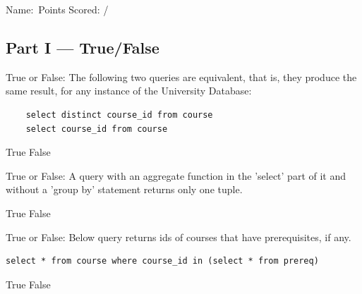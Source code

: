 \documentclass[12pt, addpoints, answers]{exam}
\begin{document}
\noindent Name:\ \makebox[3in]{\hrulefill}\hfill Points Scored: \underline{\hspace{3em}} / \numpoints
\begin{questions}

\section*{Part I — True/False}

\begin{minipage}{\linewidth}
\question[3]
True or False: The following two queries are equivalent, that is, they produce the same result, for any instance of the University Database:\par\vspace{0.5em}
\begin{verbatim}
    select distinct course_id from course
    select course_id from course
\end{verbatim}
\begin{checkboxes}
    \CorrectChoice True
    \choice False
\end{checkboxes}
\end{minipage}\vspace{1em}

\begin{minipage}{\linewidth}
\question[2]
True or False: A query with an aggregate function in the 'select' part of it and without a 'group by' statement returns only one tuple.\par\vspace{0.5em}
\begin{checkboxes}
    \CorrectChoice True
    \choice False
\end{checkboxes}
\end{minipage}\vspace{1em}

\begin{minipage}{\linewidth}
\question[2]
True or False: Below query returns ids of courses that have prerequisites, if any.\par\vspace{0.5em}
\begin{verbatim}
select * from course where course_id in (select * from prereq)
\end{verbatim}
\begin{checkboxes}
    \choice True
    \CorrectChoice False
\end{checkboxes}
\end{minipage}\vspace{1em}


\end{questions}
\end{document}
